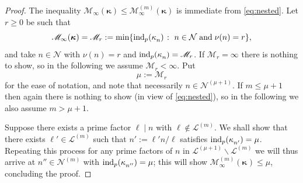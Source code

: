 \documentclass[10pt,reqno]{amsart}
\numberwithin{equation}{section}
\theoremstyle{plain}
\theoremstyle{definition}
\theoremstyle{definition}
\theoremstyle{plain}
\theoremstyle{plain}
\theoremstyle{plain}
\theoremstyle{plain}
\theoremstyle{plain}
\theoremstyle{plain}
\begin{document}
\begin{proof} %
The inequality 
$\mathscr{M}_\infty(\boldsymbol{\kappa})\leq
\mathscr{M}_\infty^{(m)}(\boldsymbol{\kappa})$ 
is immediate from \eqref{eq:nested}. Let $r\geq 0$ be such that 
\[
\mathscr{M}_\infty(\boldsymbol{\kappa})=\mathscr{M}_r:=\min\{{\rm ind}_p(\kappa_n^{})\;\colon\;n\in\mathcal{N}\;\textrm{and}\;\nu(n)=r\}, 
\]
and take $n\in\mathcal{N}$ with $\nu(n)=r$ and ${\rm ind}_p(\kappa_n^{})=\mathscr{M}_r$. If $\mathscr{M}_r=\infty$ there is nothing to show, so in the following we assume $\mathscr{M}_r<\infty$. Put
\[
\mu:=\mathscr{M}_r
\]
for the ease of notation, and note that necessarily $n\in\mathcal{N}^{(\mu+1)}$. If $m\leq \mu+1$ then again there is nothing to show (in view of \eqref{eq:nested}), so in the following we also assume $m>\mu+1$. 

Suppose there exists a prime factor $\ell\mid n$ with $\ell\notin\mathcal{L}^{(m)}$. We shall show that there exists $\ell'\in\mathcal{L}^{(m)}$ such that $n':=\ell'n/\ell$ satisfies ${\rm ind}_p(\kappa_{n'}^{})=\mu$. Repeating this process for any prime factors of $n$ in $\mathcal{L}^{(\mu+1)}\smallsetminus\mathcal{L}^{(m)}$ we will thus arrive at $n''\in\mathcal{N}^{(m)}$ with ${\rm ind}_p(\kappa_{n''}^{})=\mu$; this will show $\mathscr{M}_{\infty}^{(m)}(\boldsymbol{\kappa}^{})\leq \mu$, concluding the proof.


\end{proof}
\end{document}
